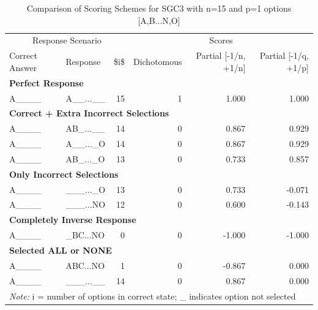 \documentclass[
  letterpaper,
  DIV=11,
  numbers=noendperiod]{scrreprt}
\begin{document}
\begin{table}

\caption{Comparison of Scoring Schemes for SGC3 with n=15 and p=1 options [A,B...N,O]  }
\centering
\begin{tabular}[t]{l|l|r|r|r|r}
\hline
\multicolumn{3}{c|}{Response Scenario } & \multicolumn{3}{c}{Scores} \\
\cline{1-3} \cline{4-6}
Correct Answer & Response & \$i\$  & Dichotomous & Partial [-1/n, +1/n] & Partial [-1/q, +1/p]\\
\hline
\multicolumn{6}{l}{\textbf{Perfect Response}}\\
\hline
\hspace{1em}A\_\_\_\_ & A\_\_...\_\_ & 15 & 1 & 1.000 & 1.000\\
\hline
\multicolumn{6}{l}{\textbf{Correct + Extra Incorrect Selections}}\\
\hline
\hspace{1em}A\_\_\_\_ & AB\_...\_\_ & 14 & 0 & 0.867 & 0.929\\
\hline
\hspace{1em}A\_\_\_\_ & A\_\_...\_O & 14 & 0 & 0.867 & 0.929\\
\hline
\hspace{1em}A\_\_\_\_ & AB\_...\_O & 13 & 0 & 0.733 & 0.857\\
\hline
\multicolumn{6}{l}{\textbf{Only Incorrect Selections}}\\
\hline
\hspace{1em}A\_\_\_\_ & \_\_\_...\_O & 13 & 0 & 0.733 & -0.071\\
\hline
\hspace{1em}A\_\_\_\_ & \_\_\_...NO & 12 & 0 & 0.600 & -0.143\\
\hline
\multicolumn{6}{l}{\textbf{Completely Inverse Response }}\\
\hline
\hspace{1em}A\_\_\_\_ & \_BC...NO & 0 & 0 & -1.000 & -1.000\\
\hline
\multicolumn{6}{l}{\textbf{Selected ALL or NONE}}\\
\hline
\hspace{1em}A\_\_\_\_ & ABC...NO & 1 & 0 & -0.867 & 0.000\\
\hline
\hspace{1em}A\_\_\_\_ & \_\_\_...\_\_ & 14 & 0 & 0.867 & 0.000\\
\hline
\multicolumn{6}{l}{\rule{0pt}{1em}\textit{Note: } i = number of options in correct state; \_ indicates option not selected}\\
\end{tabular}
\end{table}
\end{document}
